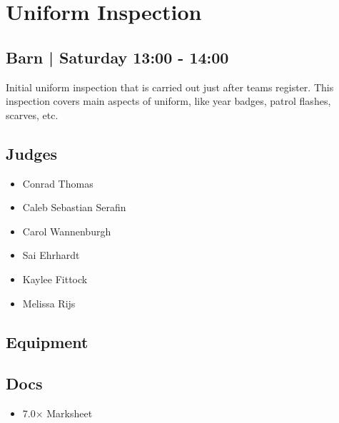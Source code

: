 \documentclass[10pt]{article}
\begin{document}
		\begin{minipage}{\linewidth}
		\setcounter{section}{2}
	\section{Uniform Inspection }
	\subsection*{Barn | Saturday 13:00 - 14:00}

	Initial uniform inspection that is carried out just after teams register. This inspection covers main aspects of uniform, like year badges, patrol flashes, scarves, etc.

	\begin{multicols}{2}
	\subsection*{\faUsers \: Judges}
	\begin{itemize}
			\item Conrad Thomas
			\item Caleb Sebastian Serafin
			\item Carol Wannenburgh
			\item Sai Ehrhardt
			\item Kaylee Fittock
			\item Melissa Rijs
		\end{itemize}
	\columnbreak
	\subsection*{\faWrench \: Equipment}
	        \vfill\null
        \subsection*{\faFile \: Docs}
     
        \begin{itemize}
                    \item 7.0$\times$ \: Marksheet
                \end{itemize}
        	\end{multicols}


	\vspace{1cm}
	\end{minipage}
\end{document}
